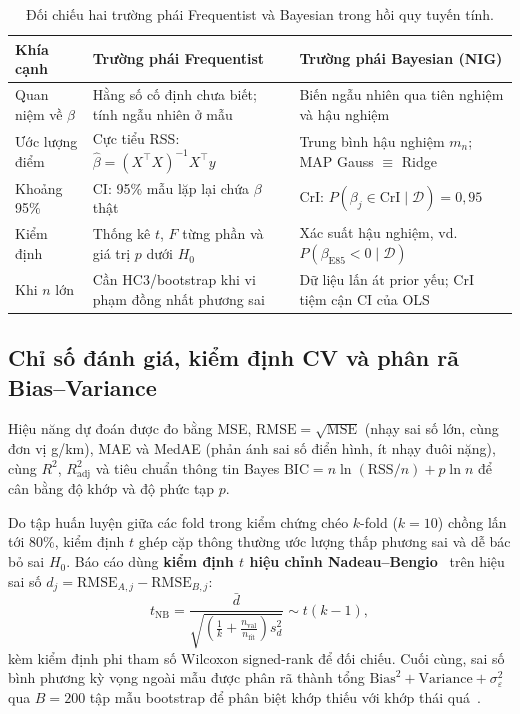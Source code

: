 \begin{table}[htbp]
  \centering
  \caption{Đối chiếu hai trường phái Frequentist và Bayesian trong hồi quy tuyến tính.}
  \label{tab:freq-bayes}
  \small
  \begin{tabular}{@{}l >{\raggedright\arraybackslash}p{6.0cm} >{\raggedright\arraybackslash}p{6.0cm}@{}}
    \toprule
    Khía cạnh & Trường phái Frequentist & Trường phái Bayesian (NIG) \\
    \midrule
    Quan niệm về $\beta$ & Hằng số cố định chưa biết; tính ngẫu nhiên ở mẫu & Biến ngẫu nhiên qua tiên nghiệm và hậu nghiệm \\
    Ước lượng điểm & Cực tiểu RSS: $\hat\beta = (X^\top X)^{-1}X^\top y$ & Trung bình hậu nghiệm $m_n$; MAP Gauss $\equiv$ Ridge \\
    Khoảng 95\% & CI: 95\% mẫu lặp lại chứa $\beta$ thật & CrI: $P(\beta_j \in \text{CrI} \mid \mathcal{D}) = 0{,}95$ \\
    Kiểm định & Thống kê $t$, $F$ từng phần và giá trị $p$ dưới $H_0$ & Xác suất hậu nghiệm, vd. $P(\beta_{\text{E85}} < 0 \mid \mathcal{D})$ \\
    Khi $n$ lớn & Cần HC3/bootstrap khi vi phạm đồng nhất phương sai & Dữ liệu lấn át prior yếu; CrI tiệm cận CI của OLS \\
    \bottomrule
  \end{tabular}
\end{table}

\subsection{Chỉ số đánh giá, kiểm định CV và phân rã Bias--Variance}
Hiệu năng dự đoán được đo bằng MSE, $\mathrm{RMSE} = \sqrt{\mathrm{MSE}}$ (nhạy sai số lớn, cùng đơn vị g/km), MAE và MedAE (phản ánh sai số điển hình, ít nhạy đuôi nặng), cùng $R^2$, $R^2_{\mathrm{adj}}$ và tiêu chuẩn thông tin Bayes $\mathrm{BIC} = n\ln(\mathrm{RSS}/n) + p\ln n$ để cân bằng độ khớp và độ phức tạp $p$.

Do tập huấn luyện giữa các fold trong kiểm chứng chéo $k$-fold ($k = 10$) chồng lấn tới 80\%, kiểm định $t$ ghép cặp thông thường ước lượng thấp phương sai và dễ bác bỏ sai $H_0$. Báo cáo dùng \textbf{kiểm định $t$ hiệu chỉnh Nadeau--Bengio}~\cite{nadeau2003inference} trên hiệu sai số $d_j = \mathrm{RMSE}_{A,j} - \mathrm{RMSE}_{B,j}$:
\begin{equation}
  t_{\mathrm{NB}} = \frac{\bar d}{\sqrt{\left(\frac{1}{k} + \frac{n_{\mathrm{val}}}{n_{\mathrm{fit}}}\right) s_d^2}} \sim t(k-1),
  \label{eq:nadeau-bengio}
\end{equation}
kèm kiểm định phi tham số Wilcoxon signed-rank để đối chiếu. Cuối cùng, sai số bình phương kỳ vọng ngoài mẫu được phân rã thành tổng $\mathrm{Bias}^2 + \mathrm{Variance} + \sigma_\varepsilon^2$ qua $B = 200$ tập mẫu bootstrap để phân biệt khớp thiếu với khớp thái quá~\cite{hastie2009esl, bishop2006prml}.
